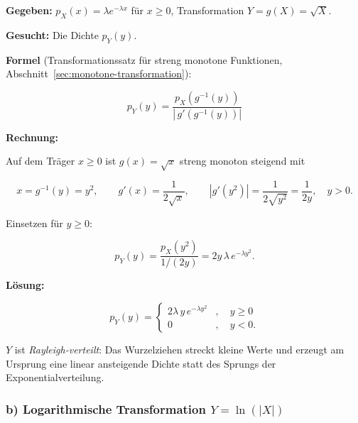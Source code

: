 \begin{beispiel}[Funktion einer Zufallsvariablen -- $Y = \sqrt{X}$]

\textbf{Gegeben:} $p_X(x) = \lambda e^{-\lambda x}$ für $x \geq 0$,
Transformation $Y = g(X) = \sqrt{X}$.

\textbf{Gesucht:} Die Dichte $p_Y(y)$.

\textbf{Formel} (Transformationssatz für streng monotone Funktionen,
Abschnitt~\ref{sec:monotone-transformation}):

$$
p_Y(y) = \frac{p_X\!\left(g^{-1}(y)\right)}{\left|\, g'\!\left(g^{-1}(y)\right)\right|}
$$

\textbf{Rechnung:}

Auf dem Träger $x \geq 0$ ist $g(x) = \sqrt{x}$ streng monoton steigend mit

$$
x = g^{-1}(y) = y^2, \qquad g'(x) = \frac{1}{2\sqrt{x}},
\qquad \left|g'(y^2)\right| = \frac{1}{2\sqrt{y^2}} = \frac{1}{2y}, \quad y > 0.
$$

Einsetzen für $y \geq 0$:

$$
p_Y(y) = \frac{p_X(y^2)}{1/(2y)} = 2y\,\lambda\, e^{-\lambda y^2}.
$$

\textbf{Lösung:}

$$
\boxed{\;p_Y(y) = \begin{cases}
2\lambda\, y\, e^{-\lambda y^2} & , \quad y \geq 0 \\[6pt]
0 & , \quad y < 0.
\end{cases}\;}
$$

$Y$ ist \emph{Rayleigh-verteilt}: Das Wurzelziehen streckt kleine Werte und
erzeugt am Ursprung eine linear ansteigende Dichte statt des Sprungs der
Exponentialverteilung.

\end{beispiel}

\subsubsection*{b) Logarithmische Transformation $Y = \ln(|X|)$}

